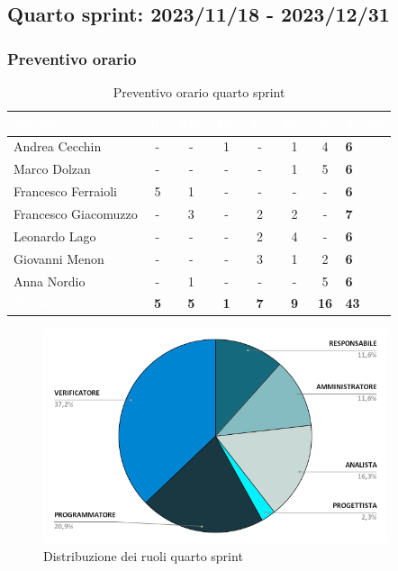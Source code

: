 \newpage
\subsection{Quarto sprint: 2023/11/18 - 2023/12/31}
\subsubsection{Preventivo orario}
{
\setlength{\tabcolsep}{10pt}
\renewcommand{\arraystretch}{1.5}
\begin{table}[h!]
    \centering
    \begin{tabularx}{\textwidth}{| l | c | c | c | c | c | c | X |}
        \hline
        \rowcolor{headerrow} \textbf{\textcolor{white}{Membro}} & \textbf{\textcolor{white}{R.}} & \textbf{\textcolor{white}{Am.}} & \textbf{\textcolor{white}{Pj.}} & \textbf{\textcolor{white}{An.}} & \textbf{\textcolor{white}{Pg.}} & \textbf{\textcolor{white}{V.}} & \textbf{\textcolor{white}{Totale}} \\
        \hline
        Andrea Cecchin & - & - & 1 & - & 1 & 4 & \textbf{6} \\
        \hline
        Marco Dolzan & - & - & - & - & 1 & 5 & \textbf{6} \\
        \hline
        Francesco Ferraioli & 5 & 1 & - & - & - & - & \textbf{6} \\
        \hline  
        Francesco Giacomuzzo & - & 3 & - & 2 & 2 & - & \textbf{7} \\
        \hline
        Leonardo Lago & - & - & - & 2 & 4 & - & \textbf{6} \\
        \hline
        Giovanni Menon & - & - & - & 3 & 1 & 2 & \textbf{6} \\
        \hline
        Anna Nordio & - & 1 & - & - & - & 5 & \textbf{6} \\
        \hline
    \cellcolor{headerrow} \textbf{\textcolor{white}{Totale}} & \textbf{5} & \textbf{5} & \textbf{1} & \textbf{7} & \textbf{9} & \textbf{16} & \textbf{43} \\
        \hline
    \end{tabularx} 
    \caption{Preventivo orario quarto sprint}
    \label{tab:preventivoorarioquartosprint}
\end{table}
}

\begin{figure}[h!]
    \centering
    \includegraphics[width=0.9\textwidth]{prev4ruoli.png}
    \caption{Distribuzione dei ruoli quarto sprint}
    \label{fig:preventivoorarioquartosprint}
\end{figure}

